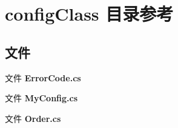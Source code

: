 \section{config\+Class 目录参考}
\label{dir_d34eb8aee23261702399afa39a243747}
\subsection*{文件}
\begin{DoxyCompactItemize}
\item 
文件 \textbf{ Error\+Code.\+cs}
\item 
文件 \textbf{ My\+Config.\+cs}
\item 
文件 \textbf{ Order.\+cs}
\end{DoxyCompactItemize}
